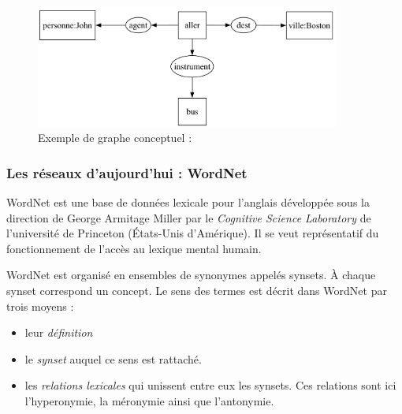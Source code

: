 {\begin{figure}[htbp]
  \centering \includegraphics[width = 10cm]{2_Etat-art/img/exemple_GC}

  \caption{Exemple de graphe conceptuel : \cite{Sowa2000}}\label{fig:exemple_GC}
\end{figure}

\subsubsection{Les réseaux d'aujourd'hui : WordNet}

WordNet est une
base de données lexicale pour l'anglais développée sous la direction
de George Armitage Miller  par le \emph{Cognitive Science
  Laboratory} de l'université de Princeton (\'Etats-Unis d'Amérique).
Il se veut représentatif du fonctionnement de l'accès au lexique
mental humain.

WordNet est organisé en ensembles de synonymes appelés synsets. À
chaque synset correspond un concept. Le sens des termes est décrit
dans WordNet par trois moyens :

\begin{itemize}
  
\item leur \emph{définition}
  
\item le \emph{synset} auquel ce sens est rattaché.
  
\item les \emph{relations lexicales} qui unissent entre eux les
  synsets.  Ces relations sont ici l'hyperonymie, la méronymie ainsi
  que l'antonymie.

\end{itemize}

}

